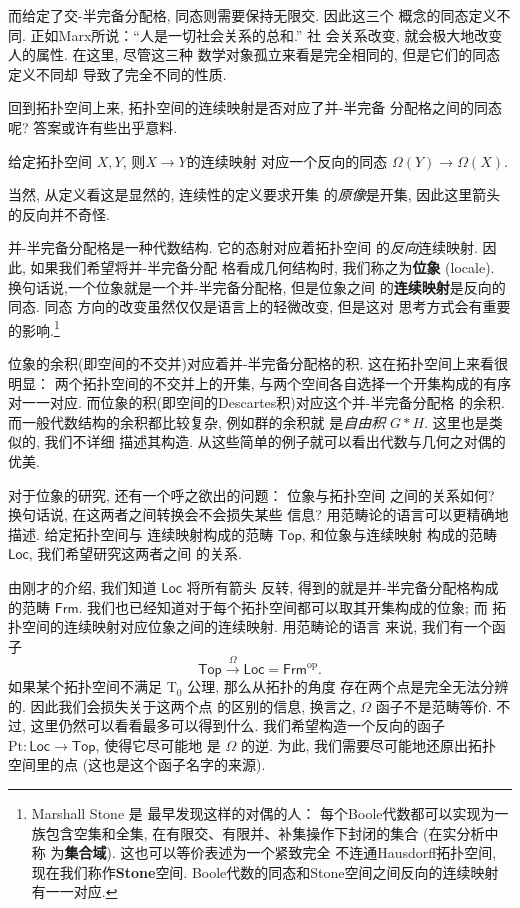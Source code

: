 而给定了交-半完备分配格, 同态则需要保持无限交. 因此这三个
概念的同态定义不同. 正如Marx所说：“人是一切社会关系的总和.” 社
会关系改变, 就会极大地改变人的属性. 在这里, 尽管这三种
数学对象孤立来看是完全相同的, 但是它们的同态定义不同却
导致了完全不同的性质.

回到拓扑空间上来, 拓扑空间的连续映射是否对应了并-半完备
分配格之间的同态呢? 答案或许有些出乎意料.
\begin{theorem}
给定拓扑空间 \(X, Y\), 则\(X \to Y\)的连续映射
对应一个反向的同态 \(\Omega(Y) \to \Omega(X)\).
\end{theorem}
当然, 从定义看这是显然的, 连续性的定义要求开集
的\emph{原像}是开集, 因此这里箭头的反向并不奇怪.

并-半完备分配格是一种代数结构. 它的态射对应着拓扑空间
的\emph{反向}连续映射. 因此, 如果我们希望将并-半完备分配
格看成几何结构时, 我们称之为\textbf{位象} (locale).
换句话说,一个位象就是一个并-半完备分配格, 但是位象之间
的\textbf{连续映射}是反向的同态. 同态
方向的改变虽然仅仅是语言上的轻微改变, 但是这对
思考方式会有重要的影响.\footnote{Marshall Stone 是
最早发现这样的对偶的人： 每个Boole代数都可以实现为一族包含空集和全集,
在有限交、有限并、补集操作下封闭的集合 (在实分析中称
为\textbf{集合域}). 这也可以等价表述为一个紧致完全
不连通Hausdorff拓扑空间, 现在我们称作\textbf{Stone}空间.
Boole代数的同态和Stone空间之间反向的连续映射有一一对应.}

位象的余积(即空间的不交并)对应着并-半完备分配格的积.
这在拓扑空间上来看很明显： 两个拓扑空间的不交并上的开集,
与两个空间各自选择一个开集构成的有序对一一对应.
而位象的积(即空间的Descartes积)对应这个并-半完备分配格
的余积. 而一般代数结构的余积都比较复杂, 例如群的余积就
是\emph{自由积} \(G * H\). 这里也是类似的, 我们不详细
描述其构造. 从这些简单的例子就可以看出代数与几何之对偶的
优美.

对于位象的研究, 还有一个呼之欲出的问题： 位象与拓扑空间
之间的关系如何? 换句话说, 在这两者之间转换会不会损失某些
信息? 用范畴论的语言可以更精确地描述. 给定拓扑空间与
连续映射构成的范畴 \(\mathsf{Top}\), 和位象与连续映射
构成的范畴 \(\mathsf{Loc}\), 我们希望研究这两者之间
的关系.

由刚才的介绍, 我们知道 \(\mathsf{Loc}\) 将所有箭头
反转, 得到的就是并-半完备分配格构成的范畴 \(\mathsf{Frm}\).
我们也已经知道对于每个拓扑空间都可以取其开集构成的位象; 而
拓扑空间的连续映射对应位象之间的连续映射. 用范畴论的语言
来说, 我们有一个函子
\[\mathsf{Top} \xrightarrow{\Omega} \mathsf{Loc}
= \mathsf{Frm}^{\mathrm{op}}.\]
如果某个拓扑空间不满足 T\(_0\) 公理, 那么从拓扑的角度
存在两个点是完全无法分辨的. 因此我们会损失关于这两个点
的区别的信息, 换言之, \(\Omega\) 函子不是范畴等价.
不过, 这里仍然可以看看最多可以得到什么.
我们希望构造一个反向的函子 \(\mathrm{Pt} :
\mathsf{Loc} \to \mathsf{Top}\), 使得它尽可能地
是 \(\Omega\) 的逆. 为此, 我们需要尽可能地还原出拓扑
空间里的点 (这也是这个函子名字的来源).

